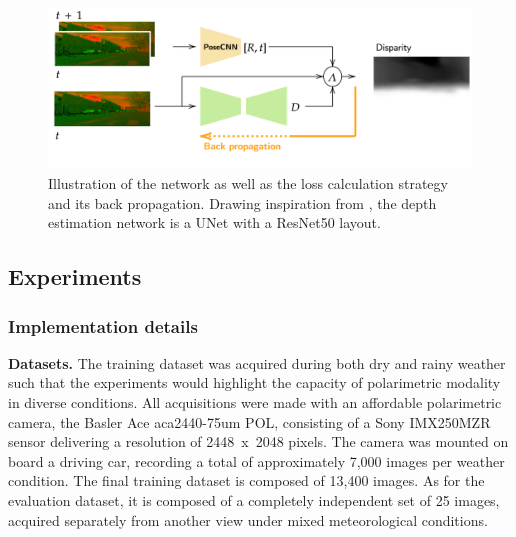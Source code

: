 \begin{figure}[t]
	\centering
	\vspace{.1cm}
	\includegraphics[keepaspectratio,width=\linewidth]{Figures/ECCV/diagramnet}
	\caption{Illustration of the network as well as the loss calculation strategy and its back propagation. Drawing inspiration from \cite{godard2019digging}, the depth estimation network is a UNet with a ResNet50 layout.}
	\label{fig:net}
\end{figure}

\subsection{Experiments}

\subsubsection{Implementation details}

\indent
\textbf{Datasets.} The training dataset was acquired during both dry and rainy weather such that the experiments would highlight the capacity of polarimetric modality in diverse conditions.
All acquisitions were made with an affordable polarimetric camera, the Basler Ace aca2440-75um POL, consisting of a Sony IMX250MZR sensor delivering a resolution of 2448~x~2048 pixels.
The camera was mounted on board a driving car, recording a total of approximately 7,000 images per weather condition. The final training dataset is composed of 13,400 images.
As for the evaluation dataset, it is composed of a completely independent set of 25 images, acquired separately from another view under mixed meteorological conditions.\\

